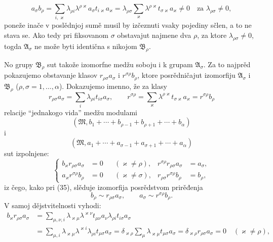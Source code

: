 \documentclass[11pt]{article}
\begin{document}
\[
 a_\sigma b_\rho=
 \sum_{i,\varkappa}\lambda_{\rho i}\lambda^{\rho\varkappa}a_\sigma t_{i\varkappa}a_\varkappa
 =\lambda_{\rho\sigma}
 \sum_{\varkappa}\lambda^{\rho\varkappa}t_{\sigma\varkappa}a_\varkappa\ne0
 \quad\text{za }\lambda_{\rho\sigma}\ne0,
\]
poneže inače v poslědnjoj sumě musil by izčeznuti vsaky pojediny sčlen, a to ne stava se. Ako tedy pri fiksovanom \(\sigma\) obstavajut najmene dva \(\rho\), za ktore \(\lambda_{\rho\sigma}\ne0\), togda \(\mathfrak A_\sigma\) ne može byti identična s nikojom \(\mathfrak B_\rho\).

No grupy \(\mathfrak B_\rho\) sut takože izomorfne medžu soboju i k grupam \(\mathfrak A_\sigma\). Za to najprěd pokazujemo obstavanje klasov \(r_{\rho\sigma}a_\sigma\) i \(r^{\sigma\rho}b_\rho\), ktore posrědničajut izomorfiju \(\mathfrak A_\sigma\) i \(\mathfrak B_\rho\) (\(\rho,\sigma=1,
\ldots,\alpha\)). Dokazujemo imenno, že za klasy
\[
 r_{\rho\sigma}a_\sigma=\sum_i\lambda_{\rho i}t_{i\sigma}a_\sigma,
 \qquad
 r^{\sigma\rho}=\sum_\varkappa\lambda^{\rho\varkappa}t_{\sigma\varkappa}a_\varkappa
 =r^{\sigma\rho}b_\rho
\]
relacije ``jednakogo vida'' medžu modulami
\[
 (\mathfrak M,b_1+\cdots+b_{\rho-1}+b_{\rho+1}+\cdots+b_\alpha)
\]
i
\[
 (\mathfrak M,a_1+\cdots+a_{\sigma-1}+a_{\sigma+1}+\cdots+a_\alpha)
\]
sut izpolnjene:
\begin{equation}
\left\{
\begin{aligned}
 b_\varkappa r_{\rho\sigma}a_\sigma&=0 &&(\varkappa\ne\rho),&
 r^{\sigma\rho}r_{\rho\sigma}a_\sigma&=a_\sigma,\\
 a_\varkappa r^{\sigma\rho}b_\rho&=0 &&(\varkappa\ne\sigma),&
 r_{\rho\sigma}r^{\sigma\rho}b_\rho&=b_\rho,
\end{aligned}\right.
\tag{39}
\end{equation}
iz čego, kako pri (35), slěduje izomorfija posrědstvom prirěđenja
\begin{equation}
 b_\rho\sim r_{\rho\sigma}a_\sigma,
 \qquad
 a_\sigma\sim r^{\sigma\rho}b_\rho.
\tag{40}
\end{equation}
V samoj dějstvitelnosti vyhodi:
\[
\begin{aligned}
 b_\varkappa r_{\rho\sigma}a_\sigma
 &=\sum_{\mu,\nu,i}\lambda_{\varkappa\mu}\lambda^{\varkappa\nu}t_{\mu\nu}a_\nu\lambda_{\rho i}t_{i\sigma}a_\sigma\\
 &=\sum_{\mu,i}\lambda_{\varkappa\mu}\lambda^{\varkappa i}\lambda_{\rho i}t_{\mu\sigma}a_\sigma
 =\delta_{\varkappa\rho}\sum_\mu\lambda_{\varkappa\mu}t_{\mu\sigma}a_\sigma
 =\delta_{\varkappa\rho}r_{\rho\sigma}a_\sigma=0\quad(\varkappa\ne\rho),
\end{aligned}
\]
\end{document}
